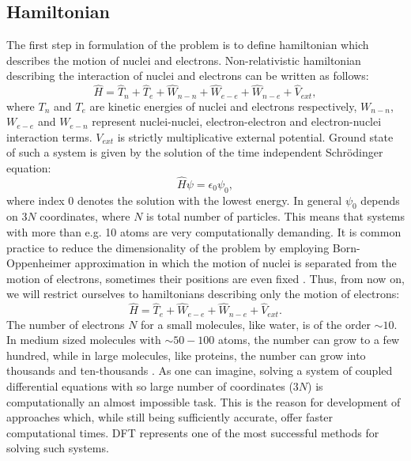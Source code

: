 \documentclass[openany, longbibliography,slovene,a4paper,12pt]{article}
\begin{document}
\subsection{Hamiltonian}
The first step in formulation of the problem is to define hamiltonian which
describes the motion of nuclei and electrons. Non-relativistic hamiltonian
describing the interaction of  nuclei and electrons can be written as follows:
\begin{equation} \label{full_hamiltonian}
\hat H= \hat T_n + \hat  T_e + \hat  W_{n-n} + \hat W_{e-e} + \hat W_{n-e} + \hat V_{ext},
\end{equation}
where $T_n$ and $T_e$ are kinetic energies of nuclei and electrons respectively,
$W_{n-n}$, $W_{e-e}$ and $W_{e-n}$ represent nuclei-nuclei, electron-electron
and electron-nuclei interaction terms. $V_{ext}$ is strictly multiplicative
external potential. Ground state of such a system is given by the solution of
the time independent Schr{\"o}dinger equation:
\begin{equation} \label{ham_solution}
\hat H \psi = \epsilon_0 \psi_0,
\end{equation} 
where index $0$ denotes the solution with the lowest energy. In general $\psi_0$
depends on $3N$ coordinates, where $N$ is total number of particles. This means
that systems with more than e.g. 10 atoms are very computationally
demanding. It is common practice to reduce the dimensionality of the problem by employing
Born-Oppenheimer approximation in which the motion of nuclei is separated from
the motion of electrons, sometimes their positions are even fixed
\cite{advanced_course, nobel_lecture}. Thus, from now on, we will
restrict ourselves to hamiltonians describing only the motion of electrons:
\begin{equation} \label{electron_hamiltonian}
\hat H=  \hat  T_e  + \hat W_{e-e} + \hat W_{n-e} + \hat V_{ext}.
\end{equation}
The number of electrons $N$ for a small molecules, like water, is of the order
$\sim 10$. In medium sized molecules with $\sim 50-100$ atoms, the number can
grow to a few hundred, while in large molecules, like proteins, the number can
grow into thousands and ten-thousands \cite{ab_initio_nmr_spect_molec}. As one can imagine, solving a system of
coupled differential equations with so large number of coordinates ($3N$) is
computationally an almost impossible task.
This is the reason for development of approaches which, while still being
sufficiently accurate, offer faster computational times. DFT represents one of
the most successful methods for solving such systems.
\end{document}
